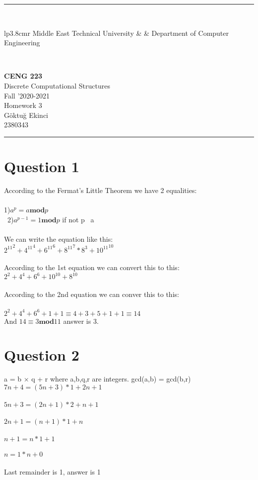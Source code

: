 \documentclass[12pt]{article}
\newcommand{\HRule}{\rule{\linewidth}{1mm}}
\begin{document}
\noindent
\HRule \\[3mm]
\small
\begin{tabular}[b]{lp{3.8cm}r}
{} Middle East Technical University &  &
{} Department of Computer Engineering \\
\end{tabular} \\
\begin{center}

                 \LARGE \textbf{CENG 223} \\[4mm]
                 \Large Discrete Computational Structures \\[4mm]
                \normalsize Fall '2020-2021 \\
                    \Large Homework 3 \\
                \normalsize Göktuğ Ekinci  \\
                \normalsize 2380343  \\
\end{center}
\HRule


\section*{Question 1}
According to the Fermat's Little Theorem we have 2 equalities: \\\\ 
1)$a^p = a \mathbf{mod}p$ \\\ 
2)$a^{p-1} = 1 \mathbf{mod}p$ if not p \vline\  a \\\\
We can write the equation like this: \\
${2^{11}}^2 + {4^{11}}^4 + {6^{11}}^6 + {8^{11}}^7 * 8^3 + {10^{11}}^{10}$ \\\\
According to the 1st equation we can convert this to this: \\

$2^2 + 4^4 + 6^6 + 10^{10} + 8^{10}$\\\\
According to the 2nd equation we can conver this to this: \\\\
$2^2 + 4^4 + 6^6 + 1 +1 \equiv 4 + 3 + 5 + 1 + 1 \equiv 14$\\

And $14 \equiv 3 \mathbf{mod}11$ answer is 3.

\section*{Question 2}
a = b $\times$ q + r where a,b,q,r are integers. gcd(a,b) = gcd(b,r)
$7n + 4 = (5n+3) * 1 + 2n + 1$\\\\
$5n+3 = (2n+1) * 2 + n+1 $\\\\
$2n + 1 = (n+1)*1 + n $\\\\
$ n+1 = n * 1 + 1$\\\\
$ n = 1 * n + 0$\\\\
Last remainder is 1, answer is 1
\end{document}
